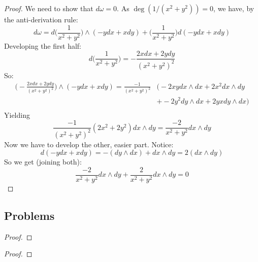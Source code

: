 \begin{customprob}{4.9}
\end{customprob}

\begin{proof}
	We need to show that $d\omega = 0$. As $\deg(1/(x^2 + y^2)) = 0$, we have, by the anti-derivation rule:
	$$d\omega = d\bigg(\frac{1}{x^2  +y^2} \bigg) \wedge (-ydx + xdy) + \bigg(\frac{1}{x^2  +y^2} \bigg) d(-y dx + xdy)$$
	Developing the first half:
	$$d\bigg(\frac{1}{x^2  +y^2} \bigg) = - \frac{2xdx + 2ydy}{(x^2 + y^2)^2}$$
	So:
	\begin{align*}
		\bigg(-\frac{2xdx + 2ydy}{(x^2 + y^2)^2}\bigg) \wedge (-ydx + xdy)  =
		\frac{-1}{(x^2 + y^2)^2} & \Bigg( -2xy dx\wedge dx + 2x^2dx \wedge dy     \\
		                         & + -2y^2 dy \wedge dx + 2yx dy \wedge dx \Bigg) \\
	\end{align*}
	Yielding
	$$\frac{-1}{(x^2 + y^2)^2}(2x^2 + 2y^2) dx\wedge dy = \frac{-2}{x^2 + y^2} dx \wedge dy$$
	Now we have to develop the other, easier part. Notice:
	$$d(-y dx + xdy) = - (dy \wedge dx) + dx\wedge dy = 2(dx \wedge dy)$$
	So we get (joining both):
	$$ \frac{-2}{x^2 + y^2} dx \wedge dy +  \frac{2}{x^2 + y^2} dx \wedge dy = 0$$
\end{proof}

\subsection{Problems}

\begin{problem}
\end{problem}

\begin{proof}
\end{proof}

\begin{problem}
\end{problem}

\begin{proof}
\end{proof}
